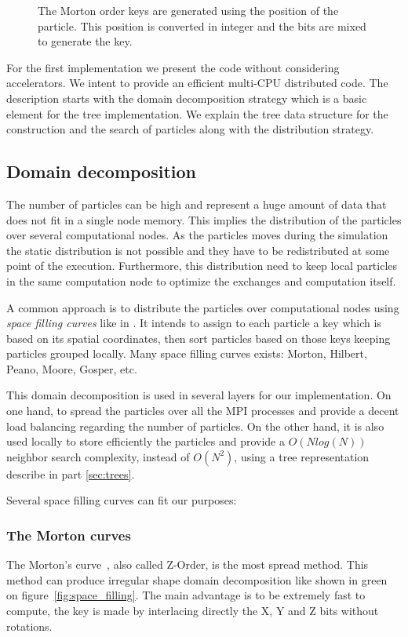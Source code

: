 \begin{figure}[t!]
\centering

\caption[Morton order keys generation]{The Morton order keys are generated using the position of the particle. This position is converted in integer and the bits are mixed to generate the key.}
\end{figure}

For the first implementation we present the code without considering accelerators. 
We intent to provide an efficient multi-CPU distributed code. 
The description starts with the domain decomposition strategy which is a basic element for the tree implementation.
We explain the tree data structure for the construction and the search of particles along with the distribution strategy.

\subsection{Domain decomposition}
\label{sec:domain_decomposition}
The number of particles can be high and represent a huge amount of data that does not fit in a single node memory. 
This implies the distribution of the particles over several computational nodes. 
As the particles moves during the simulation the static distribution is not possible and they have to be redistributed at some point of the execution. 
Furthermore, this distribution need to keep local particles in the same computation node to optimize the exchanges and computation itself.

A common approach is to distribute the particles over computational nodes using \textit{space filling curves} like in \cite{warren20132hot,springel2005cosmological,bedorf201424}. 
It intends to assign to each particle a key which is based on its spatial coordinates, then sort particles based on those keys keeping particles grouped locally.
Many space filling curves exists: Morton, Hilbert, Peano, Moore, Gosper, etc.\

This domain decomposition is used in several layers for our implementation. 
On one hand, to spread the particles over all the MPI processes and provide a decent load balancing regarding the number of particles. 
On the other hand, it is also used locally to store efficiently the particles and provide a $O(N log(N))$ neighbor search complexity, instead of $O(N^2)$, using a tree representation describe in part \ref{sec:trees}. 

Several space filling curves can fit our purposes:
\subsubsection*{The Morton curves} The Morton's curve~\cite{morton1966computer}, also called Z-Order, is the most spread method. 
This method can produce irregular shape domain decomposition like shown in green on figure~\ref{fig:space_filling}. 
The main advantage is to be extremely fast to compute, the key is made by interlacing directly the X, Y and Z bits without rotations. 
